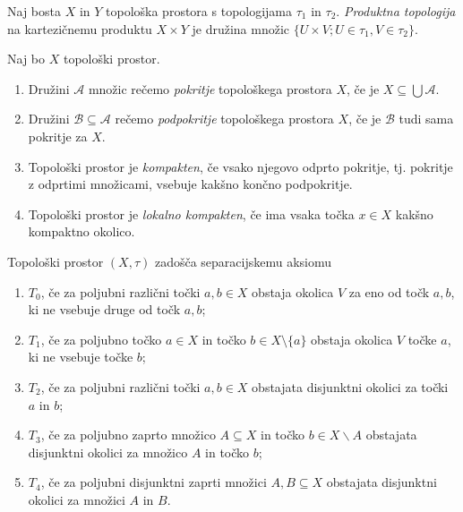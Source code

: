 \documentclass[mat1]{fmfdelo}
\begin{document}
\begin{definicija}
Naj bosta $X$ in $Y$ topološka prostora s topologijama $\tau_1$ in $\tau_2$. \emph{Produktna topologija} na kartezičnemu produktu $X \times Y$ je družina množic $\lbrace U \times V ; U \in \tau_1, V \in \tau_2 \rbrace$.
\end{definicija}

\begin{definicija}\label{def:kompakt}
Naj bo $X$ topološki prostor.
\begin{enumerate}
\item Družini $\mathcal{A}$ množic rečemo \emph{pokritje} topološkega prostora $X$, če je $X \subseteq \bigcup \mathcal{A}$.
\item Družini $\mathcal{B} \subseteq \mathcal{A}$ rečemo \emph{podpokritje} topološkega prostora $X$, če je $\mathcal{B}$ tudi sama pokritje za $X$.
\item Topološki prostor je \emph{kompakten}, če vsako njegovo odprto pokritje, tj. pokritje z odprtimi množicami, vsebuje kakšno končno podpokritje.
\item Topološki prostor je \emph{lokalno kompakten}, če ima vsaka točka $x \in X$ kakšno kompaktno okolico.
\end{enumerate}
\end{definicija}


\begin{definicija}\label{def:sepaks}
	Topološki prostor $(X, \tau)$ zadošča separacijskemu aksiomu
	\begin{enumerate}
		\item $T_0$, če za poljubni različni točki $a, b \in X$ obstaja okolica $V$ za eno od točk $a, b$, ki ne vsebuje druge od točk $a, b$;
		\item $T_1$, če za poljubno točko $a \in X$ in točko $b \in X\setminus\lbrace a \rbrace$ obstaja okolica $V$ točke $a$, ki ne vsebuje točke $b$;
		\item $T_2$, če za poljubni različni točki $a, b \in X$ obstajata disjunktni okolici za točki $a$ in $b$;
		\item $T_3$, če za poljubno zaprto množico $A \subseteq X$ in točko $b \in X\backslash A$ obstajata disjunktni okolici za množico $A$ in točko $b$;
		\item $T_4$, če za poljubni disjunktni zaprti množici $A, B \subseteq X$ obstajata disjunktni okolici za množici $A$ in $B$.
	\end{enumerate}
\end{definicija}
\end{document}
